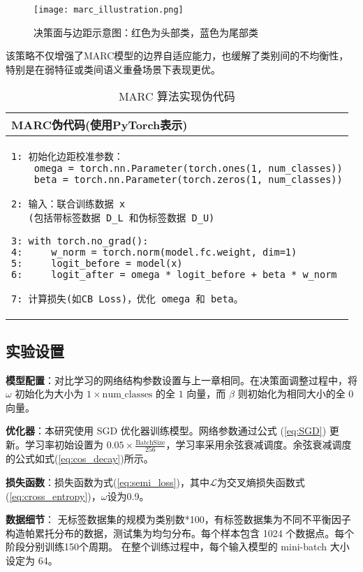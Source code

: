 \documentclass[master]{thesis-uestc}
\begin{document}
\begin{figure}[H]
    \centering
    \texttt{[image: marc\_illustration.png]}
    \caption{决策面与边距示意图：红色为头部类，蓝色为尾部类}
    \label{marc_illustration}
\end{figure}
该策略不仅增强了MARC模型的边界自适应能力，也缓解了类别间的不均衡性，特别是在弱特征或类间语义重叠场景下表现更优。

\begin{table}[h]
    \centering
    {
    \begin{tabular}{@{}l@{}}
    \toprule
    \textbf{MARC伪代码(使用PyTorch表示)} \\
    \midrule
    \begin{lstlisting}[basicstyle=\fontspec{Times New Roman}, frame=none]
1: 初始化边距校准参数：
    omega = torch.nn.Parameter(torch.ones(1, num_classes))
    beta = torch.nn.Parameter(torch.zeros(1, num_classes))

2: 输入：联合训练数据 x 
   (包括带标签数据 D_L 和伪标签数据 D_U)

3: with torch.no_grad():
4:     w_norm = torch.norm(model.fc.weight, dim=1)
5:     logit_before = model(x)
6:     logit_after = omega * logit_before + beta * w_norm

7: 计算损失(如CB Loss)，优化 omega 和 beta。
    \end{lstlisting} \\
    \bottomrule
    \end{tabular}
    }
    \caption{{MARC 算法实现伪代码}}
    \label{alg:marc}
\end{table}


\subsection{实验设置}
\textbf{模型配置}：对比学习的网络结构参数设置与上一章相同。在决策面调整过程中，将 $\omega$ 初始化为大小为 $1 \times \text{num\_classes}$ 的全 $1$ 向量，而 $\beta$ 则初始化为相同大小的全 $0$ 向量。

\textbf{优化器}：本研究使用 SGD 优化器训练模型。网络参数通过公式 (\ref{eq:SGD}) 更新。学习率初始设置为 \( 0.05 \times \frac{\text{BatchSize}}{256} \)，学习率采用余弦衰减调度。余弦衰减调度的公式如式(\ref{eq:cos_decay})所示。

\textbf{损失函数}：损失函数为式(\ref{eq:semi_loss})，其中$\mathcal{L}$为交叉熵损失函数式(\ref{eq:cross_entropy})，$\omega$设为0.9。

\textbf{数据细节}：
无标签数据集的规模为类别数*100，有标签数据集为不同不平衡因子构造帕累托分布的数据，测试集为均匀分布。每个样本包含 1024 个数据点。每个阶段分别训练150个周期。
在整个训练过程中，每个输入模型的 mini-batch 大小设定为 64。
\FloatBarrier  %
\end{document}

